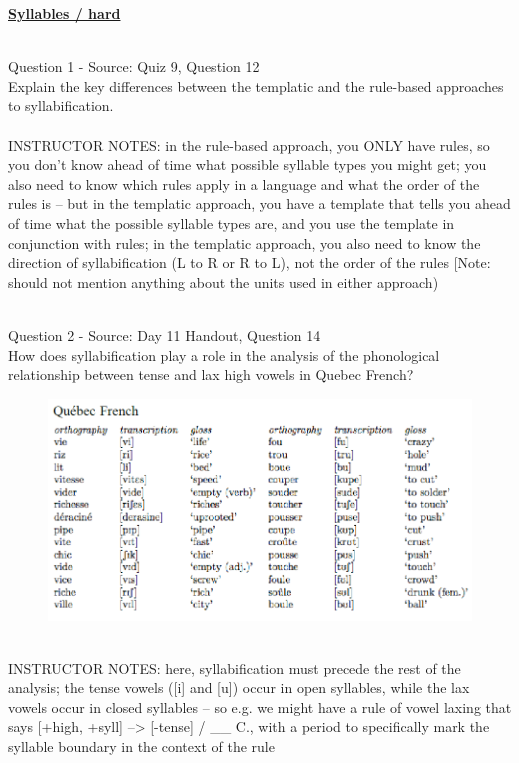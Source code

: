 \documentclass[12pt]{article}
\begin{document}
\newpage\textbf{\underline{\huge Syllables / hard\\}}

~\\

{\large Question 1} - Source: Quiz 9, Question 12\\

Explain the key differences between the templatic and the rule-based approaches to syllabification.\\


~\\
INSTRUCTOR NOTES: in the rule-based approach, you ONLY have rules, so you don't know ahead of time what possible syllable types you might get; you also need to know which rules apply in a language and what the order of the rules is -- but in the templatic approach, you have a template that tells you ahead of time what the possible syllable types are, and you use the template in conjunction with rules; in the templatic approach, you also need to know the direction of syllabification (L to R or R to L), not the order of the rules [Note: should not mention anything about the units used in either approach)


~\\

{\large Question 2} - Source: Day 11 Handout, Question 14\\

How does syllabification play a role in the analysis of the phonological relationship between tense and lax high vowels in Quebec French?\\

\begin{figure}[H]
\includegraphics{../images/quebecfrench.png}
\end{figure}

~\\
INSTRUCTOR NOTES: here, syllabification must precede the rest of the analysis; the tense vowels ([i] and [u]) occur in open syllables, while the lax vowels occur in closed syllables -- so e.g. we might have a rule of vowel laxing that says [+high, +syll] --> [-tense] / \_\_ C., with a period to specifically mark the syllable boundary in the context of the rule
\end{document}
